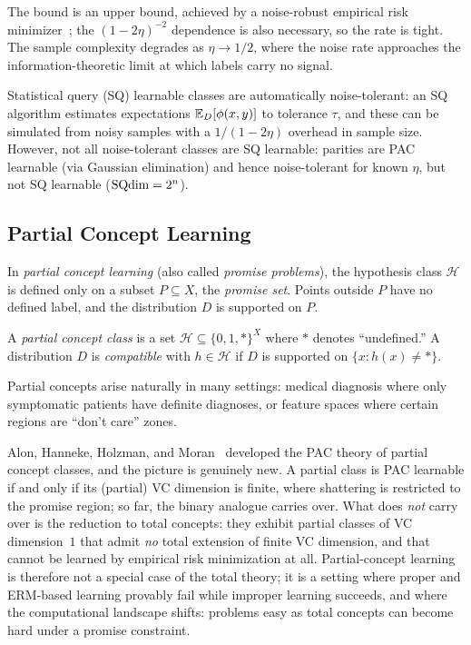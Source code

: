 The bound is an upper bound, achieved by a noise-robust empirical risk
minimizer~\cite{AngluinLaird1988}; the $(1-2\eta)^{-2}$ dependence is also
necessary, so the rate is tight.  The sample complexity degrades as
$\eta \to 1/2$, where the noise rate approaches the information-theoretic
limit at which labels carry no signal.

\begin{remark}[SQ connection]
\label{rmk:sq-noise}
Statistical query (SQ) learnable classes are automatically noise-tolerant:
an SQ algorithm estimates expectations $\mathbb{E}_D[\phi(x, y)]$ to tolerance
$\tau$, and these can be simulated from noisy samples with a $1/(1-2\eta)$
overhead in sample size.  However, not all noise-tolerant classes are
SQ learnable: parities are PAC learnable (via Gaussian elimination) and
hence noise-tolerant for known $\eta$, but not SQ learnable
($\mathrm{SQdim} = 2^n$).
\end{remark}


\subsection{Partial Concept Learning}

In \emph{partial concept learning} (also called \emph{promise problems}),
the hypothesis class $\mathcal{H}$ is defined only on a subset
$P \subseteq X$, the \emph{promise set}.  Points outside $P$ have no
defined label, and the distribution $D$ is supported on $P$.

\begin{defn}
\label{def:partial-concept}
A \emph{partial concept class} is a set $\mathcal{H} \subseteq \{0, 1, *\}^X$
where $*$ denotes ``undefined.''  A distribution $D$ is \emph{compatible}
with $h \in \mathcal{H}$ if $D$ is supported on $\{x : h(x) \neq *\}$.
\end{defn}

Partial concepts arise naturally in many settings: medical diagnosis where
only symptomatic patients have definite diagnoses, or feature spaces where
certain regions are ``don't care'' zones.

Alon, Hanneke, Holzman, and Moran~\cite{AlonHannekeHolzmanMoran2021}
developed the PAC theory of partial concept classes, and the picture is
genuinely new.  A partial class is PAC learnable if and only if its
(partial) VC dimension is finite, where shattering is restricted to the
promise region; so far, the binary analogue carries over.  What does
\emph{not} carry over is the reduction to total concepts: they exhibit
partial classes of VC dimension~$1$ that admit \emph{no} total extension of
finite VC dimension, and that cannot be learned by empirical risk
minimization at all.  Partial-concept learning is therefore not a special
case of the total theory; it is a setting where proper and ERM-based
learning provably fail while improper learning succeeds, and where the
computational landscape shifts: problems easy as total concepts can become
hard under a promise constraint.


